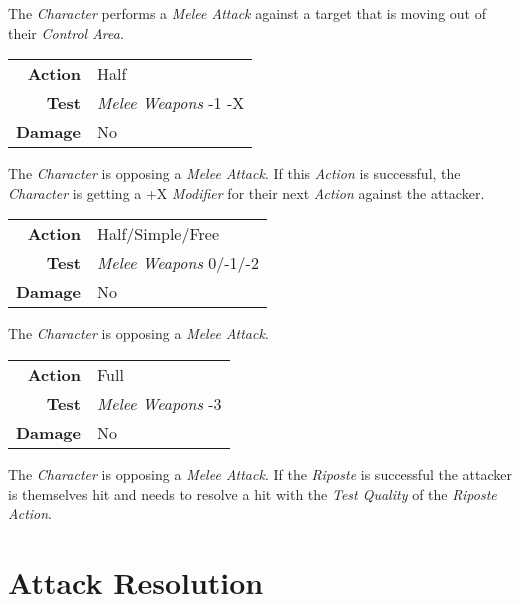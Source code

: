 \hfill

The \emph{Character} performs a \emph{Melee Attack} against a target that is
moving out of their \emph{Control Area}.



\begin{tabular}{rl}
    \textbf{Action} & Half                       \\
    \textbf{Test}   & \emph{Melee Weapons} -1 -X \\
    \textbf{Damage} & No                         \\
\end{tabular}

\hfill

The \emph{Character} is opposing a \emph{Melee Attack}. If this \emph{Action} is
successful, the \emph{Character} is getting a +X \emph{Modifier} for their next
\emph{Action} against the attacker.


\begin{tabular}{rl}
    \textbf{Action} & Half/Simple/Free             \\
    \textbf{Test}   & \emph{Melee Weapons} 0/-1/-2 \\
    \textbf{Damage} & No                           \\
\end{tabular}

\hfill

The \emph{Character} is opposing a \emph{Melee Attack}.


\begin{tabular}{rl}
    \textbf{Action} & Full                    \\
    \textbf{Test}   & \emph{Melee Weapons} -3 \\
    \textbf{Damage} & No                      \\
\end{tabular}

\hfill

The \emph{Character} is opposing a \emph{Melee Attack}. If the \emph{Riposte} is
successful the attacker is themselves hit and needs to resolve a
hit with the \emph{Test Quality} of the \emph{Riposte Action}.

\section{Attack Resolution}

